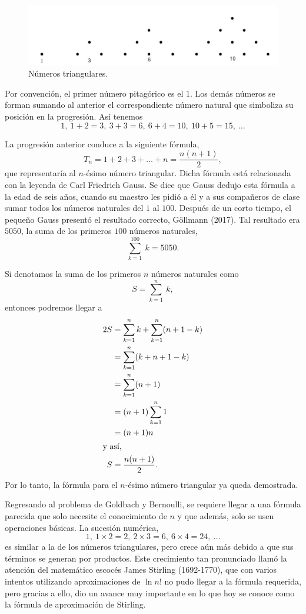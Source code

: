 \begin{figure}[htbp]
	\begin{center}
		\includegraphics[scale=0.5]{NumTriang.JPG}
	\end{center}
\caption{Números triangulares.}
\label{fig1_1}
\end{figure}

Por convención, el primer número pitagórico es el $1$. Los demás números se forman sumando al anterior el correspondiente número natural que simboliza su posición en la progresión. Así tenemos $$1,\ 1+2 = 3,\ 3+3 = 6,\ 6+4 = 10,\ 10+5=15,\ \dots$$

La progresión anterior conduce a la siguiente fórmula, $$T_n = 1+2+3+\dots+n = \frac{n(n+1)}{2},$$
que representaría al $n$-ésimo número triangular. 
Dicha fórmula está relacionada con la leyenda de Carl Friedrich Gauss. Se dice que Gauss dedujo esta fórmula a la edad de seis años, cuando su maestro les pidió a él y a sus compañeros de clase sumar todos los números naturales del $1$ al $100$. Después de un corto tiempo, el pequeño Gauss presentó el resultado correcto, Göllmann (2017).
Tal resultado era $5050$, la suma de los primeros $100$ números naturales, $$\sum_{k=1}^{100} \ k = 5050.$$

Si denotamos la suma de los primeros $n$ números naturales como $$S = \sum_{k=1}^{n}\ k,$$ entonces podremos llegar a
\begin{align*}
	2S &= \sum_{k=1}^{n} k + \sum_{k=1}^{n} (n+1-k)\\
	&= \sum_{k=1}^{n} (k+n+1-k)\\
	&= \sum_{k=1}^n (n+1)\\
	&= (n+1) \sum_{k=1}^n 1\\
	&= (n+1) n\\
\intertext{y así,}
 S &= \frac{n(n+1)}{2}.
\end{align*}
Por lo tanto, la fórmula para el $n$-ésimo número triangular ya queda demostrada.

Regresando al problema de Goldbach y Bernoulli, se requiere llegar a una fórmula parecida que solo necesite el conocimiento de $n$ y que además, solo se usen operaciones básicas. La sucesión numérica, $$1,\ 1\times2=2,\ 2\times3=6,\ 6\times4 = 24,\ \dots$$ es similar a la de los números triangulares, pero crece aún más debido a que sus términos se generan por productos. Este crecimiento tan pronunciado llamó la atención del matemático escocés James Stirling (1692-1770), que con varios intentos utilizando aproximaciones de $\ln n!$ no pudo llegar a la fórmula requerida, pero gracias a ello, dio un avance muy importante en lo que hoy se conoce como la fórmula de aproximación de Stirling.

